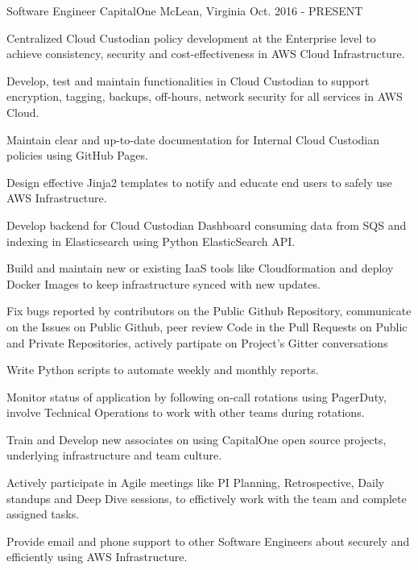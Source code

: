

\begin{cventries}

  \cventry
    {Software Engineer} %
    {CapitalOne} %
    {McLean, Virginia} %
    {Oct. 2016 - PRESENT} %
    {
      \begin{cvitems} %
        \item {Centralized Cloud Custodian policy development at the Enterprise level to achieve consistency, security and cost-effectiveness in AWS Cloud Infrastructure.}
        \item {Develop, test and maintain functionalities in Cloud Custodian to support encryption, tagging, backups, off-hours, network security for all services in AWS Cloud.}
        \item {Maintain clear and up-to-date documentation for Internal Cloud Custodian policies using GitHub Pages.}
        \item {Design effective Jinja2 templates to notify and educate end users to safely use AWS Infrastructure.}
        \item {Develop backend for Cloud Custodian Dashboard consuming data from SQS and indexing in Elasticsearch using Python ElasticSearch API.}
        \item {Build and maintain new or existing IaaS tools like Cloudformation and deploy Docker Images to keep infrastructure synced with new updates.}
        \item {Fix bugs reported by contributors on the Public Github Repository, communicate on the Issues on Public Github, peer review Code in the Pull Requests on Public and Private Repositories, actively partipate on Project's Gitter conversations}
        \item {Write Python scripts to automate weekly and monthly reports.}
        \item {Monitor status of application by following on-call rotations using PagerDuty, involve Technical Operations to work with other teams during rotations.}
        \item {Train and Develop new associates on using CapitalOne open source projects, underlying infrastructure and team culture.}
        \item {Actively participate in Agile meetings like PI Planning, Retrospective, Daily standups and Deep Dive sessions, to effictively work with the team and complete assigned tasks.}
        \item {Provide email and phone support to other Software Engineers about securely and efficiently using AWS Infrastructure.}
      \end{cvitems}
    }


\end{cventries}

